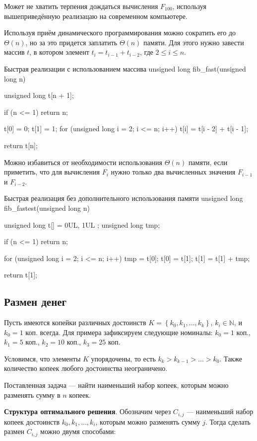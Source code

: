 Может не хватить терпения дождаться вычисления $F_{100}$, используя вышеприведённую реализацаю на современном компьютере.

Используя приём динамического программирования можно сократить его до $\Theta(n)$, но за это придется заплатить $\Theta(n)$ памяти. Для этого нужно завести массив $t$, в котором элемент $t_i = t_{i - 1} + t_{i - 2}$, где $2 \leq i \leq n$.

\begin{clst}{Быстрая реализации с использованием массива}{}
unsigned long fib_fast(unsigned long n)
{
    unsigned long t[n + 1];

    if (n <= 1)
        return n;

    t[0] = 0;
    t[1] = 1;
    for (unsigned long i = 2; i <= n; i++)
        t[i] = t[i - 2] + t[i - 1];

    return t[n];
}
\end{clst}

Можно избавиться от необходимости использования $\Theta(n)$ памяти, если приметить, что для вычисления $F_i$ нужно только два вычисленных значения $F_{i - 1}$ и $F_{i - 2}$.

\begin{clst}{Быстрая реализация без дополнительного использования памяти}{}
unsigned long fib_fastest(unsigned long n)
{
    unsigned long t[] = { 0UL, 1UL };
    unsigned long tmp;

    if (n <= 1)
        return n;

    for (unsigned long i = 2; i <= n; i++) {
        tmp = t[0];
        t[0] = t[1];
        t[1] = t[1] + tmp;
    }

    return t[1];
}
\end{clst}

\subsection{Размен денег}
Пусть имеются копейки различных достоинств $K = \left\{ k_0, k_1, ..., k_k \right\}$, $k_i \in \mathbb{N}$, и $k_0 = 1$ коп. всегда. Для примера зафиксируем следующие номиналы: $k_0 = 1$ коп., $k_1 = 5$ коп., $k_2 = 10$ коп., $k_3 = 25$ коп.

Условимся, что элементы $K$ упорядочены, то есть $k_k > k_{k - 1} > ... > k_0$. Также количество копеек любого достоинства неограничено.

Поставленная задача — найти наименьший набор копеек, которым можно разменять сумму в $n$ копеек.

\textbf{Структура оптимального решения}. Обозначим через $C_{i, j}$ — наименьший набор копеек достоинств $k_0, k_1, ..., k_i$, которым можно разменять сумму $j$. Тогда сделать размен $C_{i, j}$ можно двумя способами:

